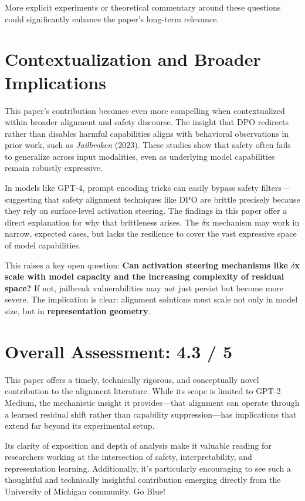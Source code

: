 \documentclass[10pt,a4paper]{article}
\begin{document}
More explicit experiments or theoretical commentary around these questions could significantly enhance the paper's long-term relevance.

\vspace{1em}

\section{Contextualization and Broader Implications}
This paper's contribution becomes even more compelling when contextualized within broader alignment and safety discourse. The insight that DPO redirects rather than disables harmful capabilities aligns with behavioral observations in prior work, such as \textit{Jailbroken} (2023). These studies show that safety often fails to generalize across input modalities, even as underlying model capabilities remain robustly expressive.

In models like GPT-4, prompt encoding tricks can easily bypass safety filters---suggesting that safety alignment techniques like DPO are brittle precisely because they rely on surface-level activation steering. The findings in this paper offer a direct explanation for why that brittleness arises. The $\delta$x mechanism may work in narrow, expected cases, but lacks the resilience to cover the vast expressive space of model capabilities.

This raises a key open question: \textbf{Can activation steering mechanisms like $\delta$x scale with model capacity and the increasing complexity of residual space?} If not, jailbreak vulnerabilities may not just persist but become more severe. The implication is clear: alignment solutions must scale not only in model size, but in \textbf{representation geometry}.

\vspace{1em}

\section{Overall Assessment: 4.3 / 5}
This paper offers a timely, technically rigorous, and conceptually novel contribution to the alignment literature. While its scope is limited to GPT-2 Medium, the mechanistic insight it provides---that alignment can operate through a learned residual shift rather than capability suppression---has implications that extend far beyond its experimental setup.

Its clarity of exposition and depth of analysis make it valuable reading for researchers working at the intersection of safety, interpretability, and representation learning. Additionally, it's particularly encouraging to see such a thoughtful and technically insightful contribution emerging directly from the University of Michigan community. Go Blue!
\end{document}

